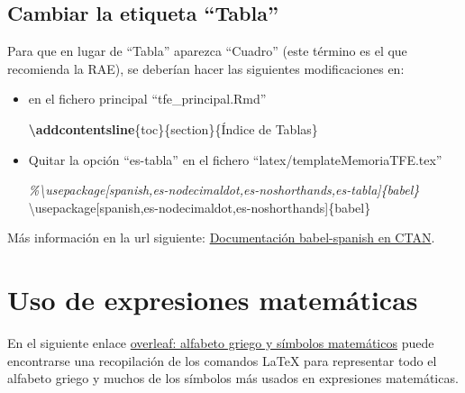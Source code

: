 \documentclass[12pt,a4paper,]{book}
\newenvironment{Shaded}{\begin{snugshade}}{\end{snugshade}}
\newcommand{\BuiltInTok}[1]{#1}
\newcommand{\CommentTok}[1]{\textcolor[rgb]{0.56,0.35,0.01}{\textit{#1}}}
\newcommand{\ExtensionTok}[1]{#1}
\newcommand{\FunctionTok}[1]{\textcolor[rgb]{0.13,0.29,0.53}{\textbf{#1}}}
\newcommand{\NormalTok}[1]{#1}
\numberwithin{dummy}{section}
\theoremstyle{ocrenumbox}
\theoremstyle{blacknumex}
\theoremstyle{blacknumbox}
\theoremstyle{ocrenum}
\theoremstyle{ocrenum}
\begin{document}
\hypertarget{cambiar-la-etiqueta-tabla}{%
\subsection{Cambiar la etiqueta
``Tabla''}\label{cambiar-la-etiqueta-tabla}}

Para que en lugar de ``Tabla'' aparezca ``Cuadro'' (este término es el
que recomienda la RAE), se deberían hacer las siguientes modificaciones
en:

\begin{itemize}
\item
  en el fichero principal ``tfe\_principal.Rmd''

\begin{Shaded}
\begin{Highlighting}[]
\FunctionTok{\textbackslash{}addcontentsline}\NormalTok{\{toc\}\{section\}\{Índice de Tablas\}}
\end{Highlighting}
\end{Shaded}
\item
  Quitar la opción ``es-tabla'' en el fichero
  ``latex/templateMemoriaTFE.tex''

\begin{Shaded}
\begin{Highlighting}[]
\CommentTok{\%\textbackslash{}usepackage[spanish,es{-}nodecimaldot,es{-}noshorthands,es{-}tabla]\{babel\}}
\BuiltInTok{\textbackslash{}usepackage}\NormalTok{[spanish,es{-}nodecimaldot,es{-}noshorthands]\{}\ExtensionTok{babel}\NormalTok{\}}
\end{Highlighting}
\end{Shaded}
\end{itemize}

Más información en la url siguiente:
\href{https://osl.ugr.es/CTAN/macros/latex/contrib/babel-contrib/spanish/spanish.pdf}{Documentación
babel-spanish en CTAN}.

\hypertarget{uso-de-expresiones-matemuxe1ticas}{%
\section{Uso de expresiones
matemáticas}\label{uso-de-expresiones-matemuxe1ticas}}

En el siguiente enlace
\href{https://www.overleaf.com/learn/latex/List_of_Greek_letters_and_math_symbols}{overleaf:
alfabeto griego y símbolos matemáticos} puede encontrarse una
recopilación de los comandos LaTeX para representar todo el alfabeto
griego y muchos de los símbolos más usados en expresiones matemáticas.
\end{document}
